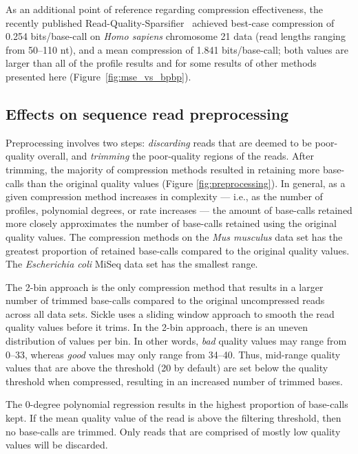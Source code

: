 \documentclass{bmcart}
\begin{document}
As an additional point of reference regarding compression
effectiveness, the recently published
Read-Quality-Sparsifier~\cite{DBLP:conf/recomb/YuYB14} achieved
best-case compression of 0.254 bits/base-call on \textit{Homo sapiens}
chromosome 21 data (read lengths ranging from 50--110 nt), and a mean
compression of 1.841 bits/base-call; both values are larger than all
of the profile results and for some results of other methods presented
here (Figure~\ref{fig:mse_vs_bpbp}).

\subsection*{Effects on sequence read preprocessing}

Preprocessing involves two steps: \emph{discarding} reads that are
deemed to be poor-quality overall, and \emph{trimming} the
poor-quality regions of the reads. After trimming, the majority of
compression methods resulted in retaining more base-calls than the
original quality values (Figure \ref{fig:preprocessing}). In general,
as a given compression method increases in complexity --- i.e., as the
number of profiles, polynomial degrees, or rate increases --- the
amount of base-calls retained more closely approximates the number of
base-calls retained using the original quality values. The compression
methods on the \textit{Mus musculus} data set has the greatest
proportion of retained base-calls compared to the original quality
values. The \textit{Escherichia coli} MiSeq data set has the smallest
range.

The 2-bin approach is the only compression method that results in a
larger number of trimmed base-calls compared to the original
uncompressed reads across all data sets. Sickle uses a sliding window
approach to smooth the read quality values before it trims. In the
2-bin approach, there is an uneven distribution of values per bin. In
other words, \emph{bad} quality values may range from 0--33, whereas
\emph{good} values may only range from 34--40. Thus, mid-range quality
values that are above the threshold (20 by default) are set below the
quality threshold when compressed, resulting in an increased number of
trimmed bases.

The 0-degree polynomial regression results in the highest proportion
of base-calls kept. If the mean quality value of the read is above the
filtering threshold, then no base-calls are trimmed. Only reads that
are comprised of mostly low quality values will be discarded.
\end{document}
